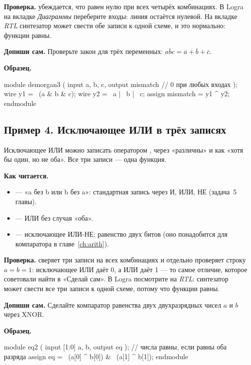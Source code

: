 \textbf{Проверка.}  убеждается, что  равен
нулю при всех четырёх комбинациях. В Logra на вкладке \emph{Диаграммы}
переберите входы: линия  остаётся нулевой. На вкладке \emph{RTL}
синтезатор может свести обе записи к одной схеме, и это нормально: функции
равны.

\textbf{Допиши сам.} Проверьте закон для трёх переменных:
$\overline{abc}=\overline a+\overline b+\overline c$.

\textbf{Образец.}\par\nopagebreak
\begin{vcode}
module demorgan3 (
    input  a, b, c,
    output mismatch      // 0 при любых входах
);
    wire y1 = ~(a & b & c);
    wire y2 = ~a | ~b | ~c;
    assign mismatch = y1 ^ y2;
endmodule
\end{vcode}

\subsection{Пример 4. Исключающее ИЛИ в трёх записях}

Исключающее ИЛИ можно записать оператором \code{\^{}}, через «различны» и как
«хотя бы один, но не оба». Все три записи --- одна функция.


\textbf{Как читается.}
\begin{itemize}
  \item {} --- «a без b или b без a»: стандартная запись через И, ИЛИ, НЕ (задача~5 главы).
  \item {} --- ИЛИ без случая «оба».
  \item {} --- исключающее ИЛИ-НЕ: равенство двух битов (оно понадобится для компаратора в главе~\ref{ch:arith}).
\end{itemize}
\textbf{Проверка.}  сверяет три записи на всех
комбинациях и отдельно проверяет строку $a=b=1$: исключающее ИЛИ даёт 0, а ИЛИ
даёт 1 --- то самое отличие, которое советовали найти в «Сделай сам». В Logra
посмотрите на \emph{RTL}: синтезатор может свести все три записи к одной схеме,
потому что функции равны.

\textbf{Допиши сам.} Сделайте компаратор равенства двух двухразрядных чисел
$a$ и $b$ через XNOR.

\textbf{Образец.}\par\nopagebreak
\begin{vcode}
module eq2 (
    input  [1:0] a, b,
    output       eq
);
    // числа равны, если равны оба разряда
    assign eq = ~(a[0] ^ b[0]) & ~(a[1] ^ b[1]);
endmodule
\end{vcode}

